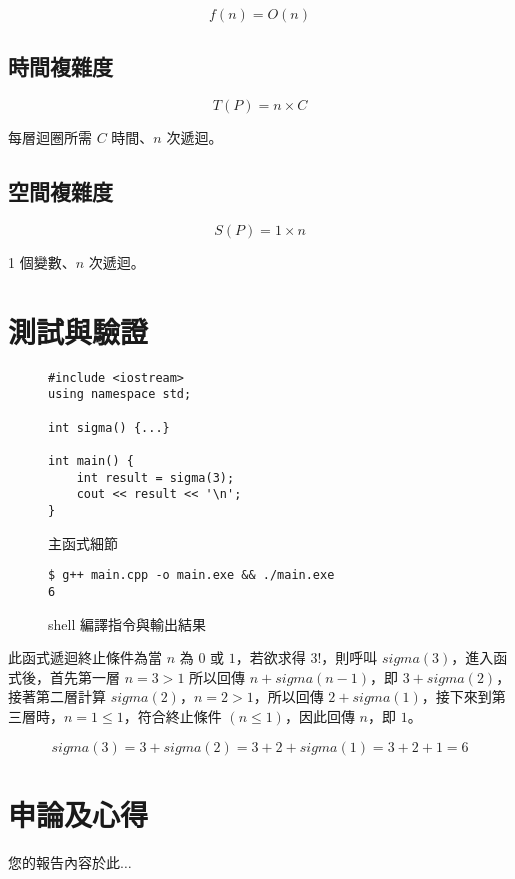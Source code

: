 \documentclass[12pt]{report}
\begin{document}
$$f(n)=O(n)$$

\section*{時間複雜度}

$$T(P)=n\times C$$

每層迴圈所需 $C$ 時間、$n$ 次遞迴。

\section*{空間複雜度}

$$S(P)=1\times n$$

1 個變數、$n$ 次遞迴。

\chapter{測試與驗證}

\begin{figure}[ht]
    \begin{verbatim}
#include <iostream>
using namespace std;

int sigma() {...}

int main() {
    int result = sigma(3);
    cout << result << '\n';
}
    \end{verbatim}

    \captionsetup{justification=centering}
    \caption{主函式細節}
    \label{fig:主函式細節}
\end{figure}

\begin{figure}[ht]
    \begin{verbatim}
$ g++ main.cpp -o main.exe && ./main.exe
6
    \end{verbatim}

    \captionsetup{justification=centering}
    \caption{shell 編譯指令與輸出結果}
    \label{fig:shell 編譯指令與輸出結果}
\end{figure}

此函式遞迴終止條件為當 $n$ 為 $0$ 或 $1$，若欲求得 $3!$，則呼叫 $sigma(3)$，進入函式後，首先第一層 $n = 3 > 1$ 所以回傳 $n + sigma(n − 1)$，即 $3 + sigma(2)$，接著第二層計算 $sigma(2)$，$n = 2 > 1$，所以回傳 $2 + sigma(1)$，接下來到第三層時，$n = 1 \le 1$，符合終止條件 $(n ≤ 1)$，因此回傳 $n$，即 $1$。

$$sigma(3)=3+sigma(2)=3+2+sigma(1)=3+2+1=6$$

\chapter{申論及心得}

您的報告內容於此$\dots$
\end{document}
